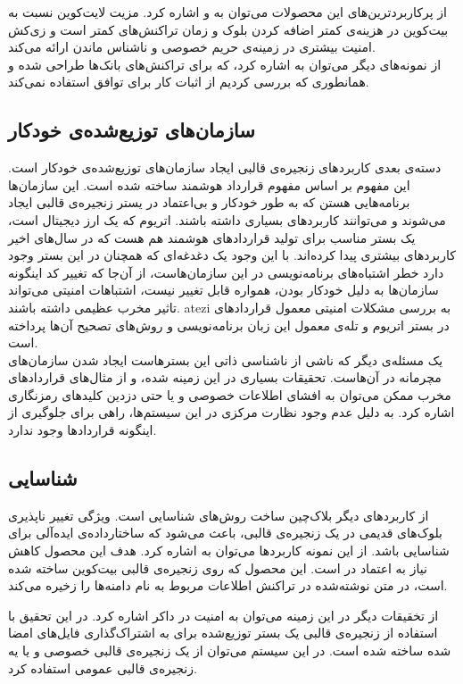 از پرکاربرد‌ترین‌‌های این محصولات می‌توان به
و 
\cite{zerocash}
اشاره کرد. مزیت لایت‌کوین نسبت به بیت‌کوین در هزینه‌ی کمتر اضافه کردن بلوک و زمان تراکنش‌های کمتر است و زی‌کش امنیت بیشتری در زمینه‌ی حریم خصوصی و ناشناس ماندن ارائه می‌کند. 
\\ 
از نمونه‌های دیگر می‌توان به 
اشاره کرد، که برای تراکنش‌های بانک‌ها طراحی شده و همانطوری که بررسی کردیم از اثبات کار برای توافق استفاده نمی‌کند. 

\subsection{سازمان‌های توزیع‌شده‌ی خودکار}
دسته‌ی بعدی کاربرد‌های زنجیره‌ی قالبی ایجاد سازمان‌های توزیع‌شده‌ی خودکار 
است. این مفهوم بر اساس مفهوم قرارداد هوشمند
\cite{SmartContract}
 ساخته شده است. این سازمان‌ها برنامه‌هایی هستن که به طور خودکار و بی‌اعتماد در یستر زنجیره‌ی قالبی ایجاد می‌شوند و می‌توانند کاربرد‌های بسیاری داشته باشند. اتریوم
\cite{Ethereum}
که یک ارز دیجیتال است، یک بستر مناسب برای تولید قرارداد‌های هوشمند هم هست که در سال‌های اخیر کاربرد‌های بیشتری پیدا کرده‌اند. با این وجود یک دغدغه‌ای که همچنان در این بستر وجود دارد خطر اشتباه‌های برنامه‌نویسی در این سازمان‌هاست، از آن‌جا که تغییر کد اینگونه سازمان‌ها به دلیل خودکار بودن، همواره قابل تغییر نیست، اشتباهات امنیتی می‌تواند تاثیر مخرب عظیمی داشته باشند. atezi
\cite{surveyAtt}
به بررسی مشکلات امنیتی معمول قراردادهای در بستر اتریوم و تله‌ی معمول این زبان برنامه‌نویسی و روش‌های تصحیح آن‌ها پرداخته است. 
\\
یک‌ مسئله‌ی دیگر که ناشی از ناشناسی ذاتی این بستر‌هاست ایجاد شدن سازمان‌های مچرمانه در آن‌هاست. تحقیقات‌ بسیاری 
\cite{gyges} \cite{smart}
در این زمینه شده، و از مثال‌های قرارداد‌های مخرب ممکن می‌توان به افشای اطلاعات خصوصی و یا حتی دزدین کلید‌های رمز‌نگاری اشاره کرد. به دلیل عدم وجود نظارت مرکزی در این سیستم‌ها، راهی برای جلوگیری از اینگونه قرارداد‌ها وجود ندارد.
\subsection{شناسایی}
از کاربرد‌های دیگر بلا‌ک‌چین ساخت‌ روش‌های شناسایی
است. ویژگی تغییر ناپذیری بلوک‌های قدیمی در یک زنجیره‌ی قالبی، باعث می‌شود که ساختارداده‌ی ایده‌آلی برای شناسایی باشد. از این نمونه کاربرد‌ها می‌توان به  اشاره کرد. هدف این محصول کاهش نیاز به اعتماد در 
 
است. این محصول که روی زنجیره‌ی قالبی بیت‌کوین ساخته شده است، در متن نوشته‌شده در تراکنش اطلاعات مربوط به نام دامنه‌ها را زخیره می‌کند. 
\par
از تخقیقات دیگر در این زمینه می‌توان به امنیت در داکر
\cite{docker}
اشاره کرد. در این تحقیق با استفاده‌ از زنجیره‌ی قالبی یک بستر توزیع‌شده برای به اشتراک‌گذاری فایل‌های امضا شده ساخته شده است. در این سیستم‌ می‌توان از یک زنجیره‌ی قالبی خصوصی و یا یه زنجیره‌ی قالبی عمومی استفاده کرد. 


